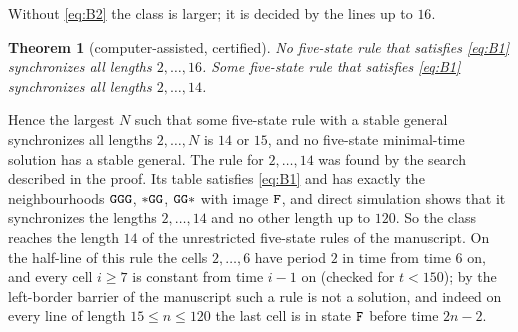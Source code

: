 \documentclass[11pt]{article}
\newtheorem{theorem}[lemma]{Theorem}
\theoremstyle{remark}
\begin{document}
Without \eqref{eq:B2} the class is larger; it is decided by the lines up to $16$.

\begin{theorem}[computer-assisted, certified]\label{thm:b1}
No five-state rule that satisfies \eqref{eq:B1} synchronizes all lengths $2,\dots,16$. Some five-state rule
that satisfies \eqref{eq:B1} synchronizes all lengths $2,\dots,14$.
\end{theorem}

Hence the largest $N$ such that some five-state rule with a stable general synchronizes all lengths
$2,\dots,N$ is $14$ or $15$, and no five-state minimal-time solution has a stable general. The rule for
$2,\dots,14$ was found by the search described in the proof. Its table satisfies \eqref{eq:B1} and has exactly
the neighbourhoods $\mathtt{G}\mathtt{G}\mathtt{G}$, $\ast\mathtt{G}\mathtt{G}$, $\mathtt{G}\mathtt{G}\ast$ with image $\mathtt{F}$, and direct simulation shows that
it synchronizes the lengths $2,\dots,14$ and no other length up to $120$. So the class reaches the length $14$
of the unrestricted five-state rules of the manuscript. On the half-line of this rule the cells $2,\dots,6$
have period $2$ in time from time $6$ on, and every cell $i\ge7$ is constant from time $i-1$ on (checked for
$t<150$); by the left-border barrier of the manuscript such a rule is not a solution, and indeed on every line
of length $15\le n\le120$ the last cell is in state $\mathtt{F}$ before time $2n-2$.
\end{document}
